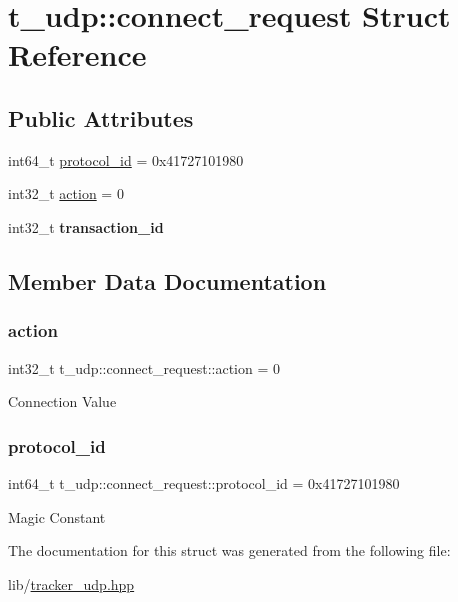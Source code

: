\hypertarget{structt__udp_1_1connect__request}{}\section{t\+\_\+udp\+:\+:connect\+\_\+request Struct Reference}
\label{structt__udp_1_1connect__request}
\subsection*{Public Attributes}
\begin{DoxyCompactItemize}
\item 
int64\+\_\+t \hyperlink{structt__udp_1_1connect__request_a74e7bf8d757ea8c891cbd7abeeb07baa}{protocol\+\_\+id} = 0x41727101980
\item 
int32\+\_\+t \hyperlink{structt__udp_1_1connect__request_ae7598b55825c7ee92c38f1a35e36ba31}{action} = 0
\item 
\mbox{\label{structt__udp_1_1connect__request_a3b32bfc52d06edcf986cb00a7ce60b17}} 
int32\+\_\+t {\bfseries transaction\+\_\+id}
\end{DoxyCompactItemize}


\subsection{Member Data Documentation}
\mbox{\label{structt__udp_1_1connect__request_ae7598b55825c7ee92c38f1a35e36ba31}} 
\subsubsection{\texorpdfstring{action}{action}}
{\footnotesize\ttfamily int32\+\_\+t t\+\_\+udp\+::connect\+\_\+request\+::action = 0}

Connection Value \mbox{\label{structt__udp_1_1connect__request_a74e7bf8d757ea8c891cbd7abeeb07baa}} 
\subsubsection{\texorpdfstring{protocol\+\_\+id}{protocol\_id}}
{\footnotesize\ttfamily int64\+\_\+t t\+\_\+udp\+::connect\+\_\+request\+::protocol\+\_\+id = 0x41727101980}

Magic Constant 

The documentation for this struct was generated from the following file\+:\begin{DoxyCompactItemize}
\item 
lib/\hyperlink{tracker__udp_8hpp}{tracker\+\_\+udp.\+hpp}\end{DoxyCompactItemize}
